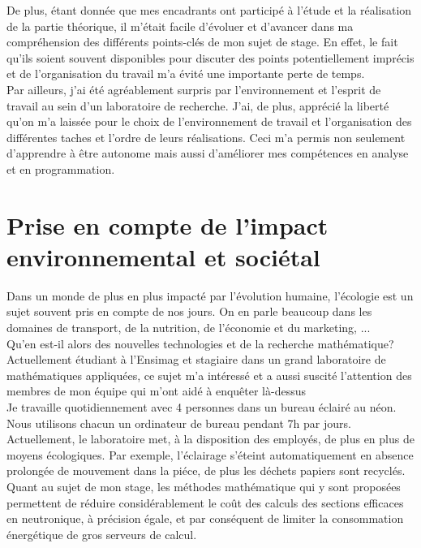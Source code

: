 De plus, étant donnée que mes encadrants ont participé à l'étude et la réalisation de la partie théorique, il m'était facile d'évoluer et d'avancer dans ma compréhension des différents points-clés de mon sujet de stage. En effet, le fait qu'ils soient souvent disponibles pour discuter des points potentiellement imprécis et de l'organisation du travail m'a évité une importante perte de temps.\\

Par ailleurs, j'ai été agréablement surpris par l'environnement et l'esprit de travail au sein d'un laboratoire de recherche. J'ai, de plus, apprécié la liberté qu'on m'a laissée pour le choix de l'environnement de travail et l'organisation des différentes taches et l'ordre de leurs réalisations. Ceci m'a permis non seulement d'apprendre à être autonome mais aussi d'améliorer mes compétences en analyse et en programmation.

\section{Prise en compte de l’impact environnemental et sociétal}\label{sec:7}
\hspace{0.5cm}
Dans un monde de plus en plus impacté par l’évolution humaine, l’écologie est un sujet souvent pris en compte de nos jours. On en parle beaucoup dans les domaines de transport, de la nutrition, de l'économie et du marketing, ...\\
Qu’en est-il alors des nouvelles technologies et de la recherche mathématique?\\

Actuellement étudiant à l’Ensimag et stagiaire dans un grand laboratoire de mathématiques appliquées, ce sujet m'a intéressé et a aussi suscité l’attention des membres de mon équipe qui m’ont aidé à enquêter là-dessus\\
Je travaille quotidiennement avec 4 personnes dans un bureau éclairé au néon. Nous utilisons chacun un ordinateur de bureau pendant 7h par jours.\\
Actuellement, le laboratoire met, à la disposition des employés, de plus en plus de moyens écologiques. Par exemple, l’éclairage s’éteint automatiquement en absence prolongée de mouvement dans la piéce, de plus les déchets papiers sont recyclés.\\
Quant au sujet de mon stage, les méthodes mathématique qui y sont proposées permettent de réduire considérablement le coût des calculs des sections efficaces en neutronique, à précision égale, et par conséquent de limiter la consommation énergétique de gros serveurs de calcul.


